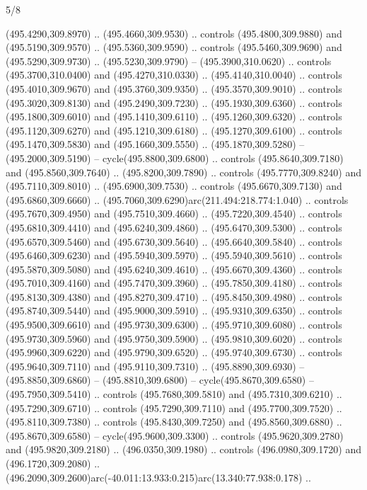 \begin{flagdescription}{5/8}
\begin{scope}[xshift=0.5\flaglength,yshift=0.5\flagwidth,scale=\flagwidth/475.63]
\begin{scope}[y=0.8pt, x=0.8pt, yscale=-1, xscale=1,shift={(-450,-300)}]
\begin{scope}[cm={{1.0,0.0,0.0,1.0,(-0.0002,0.12556)}},cm={{1.0,0.0,0.0,1.0,(0.00179,0.0)}}]
\begin{scope}[cm={{1.11592,0.0,0.0,1.11592,(-106.89933,-41.77764)}}]
\begin{scope}[draw=black,fill=cfff]
\begin{scope}[fill=black]
  (495.4290,309.8970) .. (495.4660,309.9530) .. controls (495.4800,309.9880) and
  (495.5190,309.9570) .. (495.5360,309.9590) .. controls (495.5460,309.9690) and
  (495.5290,309.9730) .. (495.5230,309.9790) -- (495.3900,310.0620) .. controls
  (495.3700,310.0400) and (495.4270,310.0330) .. (495.4140,310.0040) .. controls
  (495.4010,309.9670) and (495.3760,309.9350) .. (495.3570,309.9010) .. controls
  (495.3020,309.8130) and (495.2490,309.7230) .. (495.1930,309.6360) .. controls
  (495.1800,309.6010) and (495.1410,309.6110) .. (495.1260,309.6320) .. controls
  (495.1120,309.6270) and (495.1210,309.6180) .. (495.1270,309.6100) .. controls
  (495.1470,309.5830) and (495.1660,309.5550) .. (495.1870,309.5280) --
  (495.2000,309.5190) -- cycle(495.8800,309.6800) .. controls
  (495.8640,309.7180) and (495.8560,309.7640) .. (495.8200,309.7890) .. controls
  (495.7770,309.8240) and (495.7110,309.8010) .. (495.6900,309.7530) .. controls
  (495.6670,309.7130) and (495.6860,309.6660) ..
  (495.7060,309.6290)arc(211.494:218.774:1.040) .. controls (495.7670,309.4950)
  and (495.7510,309.4660) .. (495.7220,309.4540) .. controls (495.6810,309.4410)
  and (495.6240,309.4860) .. (495.6470,309.5300) .. controls (495.6570,309.5460)
  and (495.6730,309.5640) .. (495.6640,309.5840) .. controls (495.6460,309.6230)
  and (495.5940,309.5970) .. (495.5940,309.5610) .. controls (495.5870,309.5080)
  and (495.6240,309.4610) .. (495.6670,309.4360) .. controls (495.7010,309.4160)
  and (495.7470,309.3960) .. (495.7850,309.4180) .. controls (495.8130,309.4380)
  and (495.8270,309.4710) .. (495.8450,309.4980) .. controls (495.8740,309.5440)
  and (495.9000,309.5910) .. (495.9310,309.6350) .. controls (495.9500,309.6610)
  and (495.9730,309.6300) .. (495.9710,309.6080) .. controls (495.9730,309.5960)
  and (495.9750,309.5900) .. (495.9810,309.6020) .. controls (495.9960,309.6220)
  and (495.9790,309.6520) .. (495.9740,309.6730) .. controls (495.9640,309.7110)
  and (495.9110,309.7310) .. (495.8890,309.6930) -- (495.8850,309.6860) --
  (495.8810,309.6800) -- cycle(495.8670,309.6580) -- (495.7950,309.5410) ..
  controls (495.7680,309.5810) and (495.7310,309.6210) .. (495.7290,309.6710) ..
  controls (495.7290,309.7110) and (495.7700,309.7520) .. (495.8110,309.7380) ..
  controls (495.8430,309.7250) and (495.8560,309.6880) .. (495.8670,309.6580) --
  cycle(495.9600,309.3300) .. controls (495.9620,309.2780) and
  (495.9820,309.2180) .. (496.0350,309.1980) .. controls (496.0980,309.1720) and
  (496.1720,309.2080) ..
  (496.2090,309.2600)arc(-40.011:13.933:0.215)arc(13.340:77.938:0.178) ..

\end{scope}
\end{scope}
\end{scope}
\end{scope}
\end{scope}
\end{scope}
\end{flagdescription}

